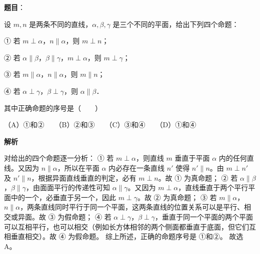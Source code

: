 \begin{answer}

\textbf{题目}：

设 $m, n$ 是两条不同的直线，$\alpha, \beta, \gamma$ 是三个不同的平面，给出下列四个命题：

① 若 $m\perp\alpha$，$n\parallel\alpha$，则 $m\perp n$；

② 若 $\alpha\parallel\beta$，$\beta\parallel\gamma$，$m\perp\alpha$，则 $m\perp\gamma$；

③ 若 $m\parallel\alpha$，$n\parallel\alpha$，则 $m\parallel n$；

④ 若 $\alpha\perp\gamma$，$\beta\perp\gamma$，则 $\alpha\parallel\beta$．

其中正确命题的序号是\mbox{（　　）}

（A）①和②　　（B）②和③　　（C）③和④　　（D）①和④

\textbf{解析}

对给出的四个命题逐一分析：
① 若 $m\perp\alpha$，则直线 $m$ 垂直于平面 $\alpha$ 内的任何直线。又因为 $n\parallel\alpha$，所以在平面 $\alpha$ 内必存在一条直线 $n'$ 使得 $n'\parallel n$。由 $m\perp n'$ 及 $n'\parallel n$，根据异面直线垂直的判定，必有 $m\perp n$。故 ① 为真命题；
② 若 $\alpha\parallel\beta$，$\beta\parallel\gamma$，由面面平行的传递性可知 $\alpha\parallel\gamma$。又因为 $m\perp\alpha$，直线垂直于两个平行平面中的一个，必垂直于另一个，因此 $m\perp\gamma$。故 ② 为真命题；
③ 若 $m\parallel\alpha$，$n\parallel\alpha$，两条直线同时平行于同一个平面，这两条直线的位置关系可以是平行、相交或异面。故 ③ 为假命题；
④ 若 $\alpha\perp\gamma$，$\beta\perp\gamma$，垂直于同一个平面的两个平面可以互相平行，也可以相交（例如长方体相邻的两个侧面都垂直于底面，但它们互相垂直相交）。故 ④ 为假命题。
综上所述，正确的命题序号是 ①和②。
故选 A。


\end{answer}
